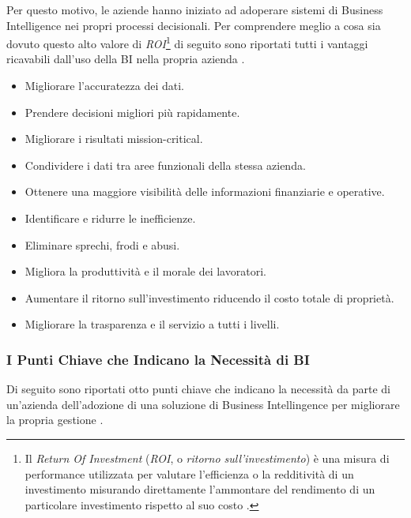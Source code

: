 Per questo motivo, le aziende hanno iniziato ad adoperare sistemi di Business Intelligence nei propri processi decisionali. Per comprendere meglio a cosa sia dovuto questo alto valore di \textit{ROI}\footnote{Il \textit{Return Of Investment} (\textit{ROI}, o \textit{ritorno sull'investimento}) è una misura di performance utilizzata per valutare l'efficienza o la redditività di un investimento misurando direttamente l'ammontare del rendimento di un particolare investimento rispetto al suo costo \cite{investopedia_roi}.} di seguito sono riportati tutti i vantaggi ricavabili dall'uso della BI nella propria azienda \cite{oracle_business_intelligence}.

\begin{itemize}
    \item Migliorare l'accuratezza dei dati.
    \item Prendere decisioni migliori più rapidamente.
    \item Migliorare i risultati mission-critical.
    \item Condividere i dati tra aree funzionali della stessa azienda.
    \item Ottenere una maggiore visibilità delle informazioni finanziarie e operative.
    \item Identificare e ridurre le inefficienze.
    \item Eliminare sprechi, frodi e abusi.
    \item Migliora la produttività e il morale dei lavoratori.
    \item Aumentare il ritorno sull'investimento riducendo il costo totale di proprietà.
    \item Migliorare la trasparenza e il servizio a tutti i livelli.
\end{itemize}

\subsubsection{I Punti Chiave che Indicano la Necessità di BI}

Di seguito sono riportati otto punti chiave che indicano la necessità da parte di un'azienda dell'adozione di una soluzione di Business Intellingence per migliorare la propria gestione \cite{boomper_book_of_bi}.

